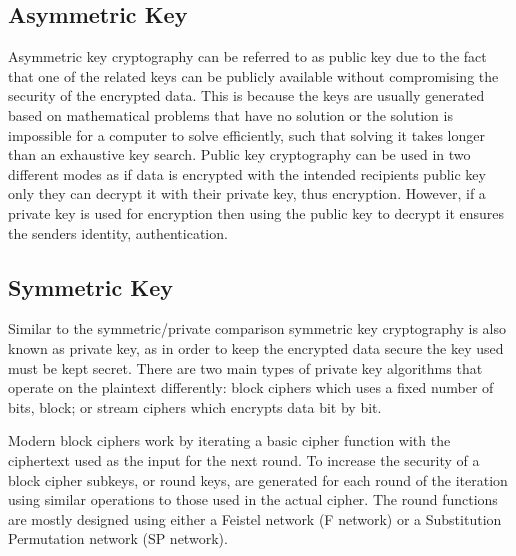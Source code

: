 \documentclass[12pt,twoside,a4paper]{report}
\begin{document}
    \subsection{Asymmetric Key}
    Asymmetric key cryptography can be referred to as public key due to the fact that one of the related keys can be publicly available without compromising the security of the encrypted data.
    This is because the keys are usually generated based on mathematical problems that have no solution or the solution is impossible for a computer to solve efficiently, such that solving it takes longer than an exhaustive key search\cite{BruceSchneier2000}.
    Public key cryptography can be used in two different modes as if data is encrypted with the intended recipients public key only they can decrypt it with their private key, thus encryption.
    However, if a private key is used for encryption then using the public key to decrypt it ensures the senders identity, authentication\cite{AlfredJ.Menezes1996}.
    
    \subsection{Symmetric Key}
    Similar to the symmetric/private comparison symmetric key cryptography is also known as private key, as in order to keep the encrypted data secure the key used must be kept secret. There are two main types of private key algorithms that operate on the plaintext differently: block ciphers which uses a fixed number of bits, block; or stream ciphers which encrypts data bit by bit\cite{AlfredJ.Menezes1996}.
    
    Modern block ciphers work by iterating a basic cipher function with the ciphertext used as the input for the next round\cite{Shannon1949}.
    To increase the security of a block cipher subkeys, or round keys, are generated for each round of the iteration using similar operations to those used in the actual cipher.
    The round functions are mostly designed using either a Feistel network\cite{Feistel1973} (F network) or a Substitution Permutation network (SP network)\cite{AlfredJ.Menezes1996}.
    
\end{document}
